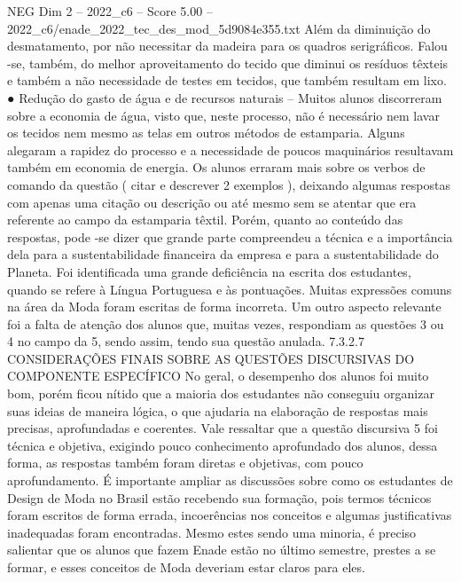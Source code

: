 \begin{textsample}{NEG Dim 2 – 2022\_c6 – Score 5.00 – 2022\_c6/enade\_2022\_tec\_des\_mod\_5d9084e355.txt}
Além da diminuição do desmatamento, por não necessitar da madeira para os quadros serigráficos.
Falou -se, também, do melhor aproveitamento do tecido que diminui os resíduos têxteis e também a não necessidade de testes em tecidos, que também resultam em lixo. {\EmojiFont ●} Redução do gasto de água e de recursos naturais – Muitos alunos discorreram sobre a economia de água, visto que, neste processo, não é necessário nem lavar os tecidos nem mesmo as telas em outros métodos de estamparia.
Alguns alegaram a rapidez do processo e a necessidade de poucos maquinários resultavam também em economia de energia.
Os alunos erraram mais sobre os verbos de comando da questão ( citar e descrever 2 exemplos ), deixando algumas respostas com apenas uma citação ou descrição ou até mesmo sem se atentar que era referente ao campo da estamparia têxtil.
Porém, quanto ao conteúdo das respostas, pode -se dizer que grande parte compreendeu a técnica e a importância dela para a sustentabilidade financeira da empresa e para a sustentabilidade do Planeta.
Foi identificada uma grande deficiência na escrita dos estudantes, quando se refere à Língua Portuguesa e às pontuações.
Muitas expressões comuns na área da Moda foram escritas de forma incorreta.
Um outro aspecto relevante foi a falta de atenção dos alunos que, muitas vezes, respondiam as questões 3 ou 4 no campo da 5, sendo assim, tendo sua questão anulada. 7.3.2.7 CONSIDERAÇÕES FINAIS SOBRE AS QUESTÕES DISCURSIVAS DO COMPONENTE ESPECÍFICO No geral, o desempenho dos alunos foi muito bom, porém ficou nítido que a maioria dos estudantes não conseguiu organizar suas ideias de maneira lógica, o que ajudaria na elaboração de respostas mais precisas, aprofundadas e coerentes.
Vale ressaltar que a questão discursiva 5 foi técnica e objetiva, exigindo pouco conhecimento aprofundado dos alunos, dessa forma, as respostas também foram diretas e objetivas, com pouco aprofundamento.
É importante ampliar as discussões sobre como os estudantes de Design de Moda no Brasil estão recebendo sua formação, pois termos técnicos foram escritos de forma errada, incoerências nos conceitos e algumas justificativas inadequadas foram encontradas.
Mesmo estes sendo uma minoria, é preciso salientar que os alunos que fazem Enade estão no último semestre, prestes a se formar, e esses conceitos de Moda deveriam estar claros para eles.

\end{textsample}
